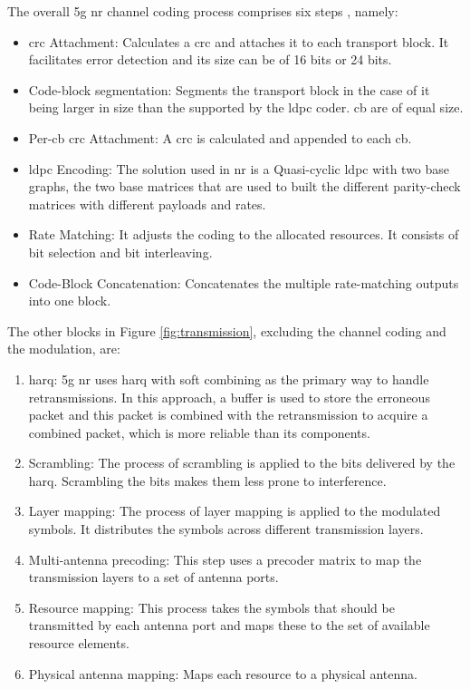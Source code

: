 The overall \gls{5g} \gls{nr} channel coding process comprises six steps \cite{ErikDahlman5G}, namely:
\begin{itemize}
	\item \Gls{crc} Attachment: Calculates a \gls{crc} and attaches it to each transport block. It facilitates error detection and its size can be of 16 bits or 24 bits.
	\item Code-block segmentation: Segments the transport block in the case of it being larger in size than the supported by the \gls{ldpc} coder. \gls{cb} are of equal size.
	\item Per-\gls{cb} \gls{crc} Attachment: A \gls{crc} is calculated and appended to each \gls{cb}.
	\item \gls{ldpc} Encoding: The solution used in \gls{nr} is a Quasi-cyclic \gls{ldpc} with two base graphs, the two base matrices that are used to built the different parity-check matrices with different payloads and rates.
	\item Rate Matching: It adjusts the coding to the allocated resources. It consists of bit selection and bit interleaving.
	\item Code-Block Concatenation: Concatenates the multiple rate-matching outputs into one block.
\end{itemize}

The other blocks in Figure \ref{fig:transmission}, excluding the channel coding and the modulation, are:
\begin{enumerate}
	\item \Gls{harq}: \gls{5g} \gls{nr} uses \gls{harq} with soft combining as the primary way to handle retransmissions. In this approach, a buffer is used to store the erroneous packet and this packet is combined with the retransmission to acquire a combined packet, which is more reliable than its components.
	\item Scrambling: The process of scrambling is applied to the bits delivered by the \gls{harq}. Scrambling the bits makes them less prone to interference.
	\item Layer mapping: The process of layer mapping is applied to the modulated symbols. It distributes the symbols across different transmission layers.
	\item Multi-antenna precoding: This step uses a precoder matrix to map the transmission layers to a set of antenna ports.
	\item Resource mapping: This process takes the symbols that should be transmitted by each antenna port and maps these to the set of available resource elements.
	\item Physical antenna mapping: Maps each resource to a physical antenna.
\end{enumerate}

